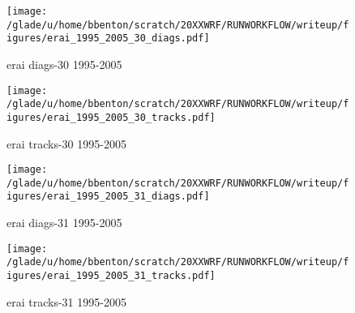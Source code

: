 \begin{figure}[!tbp]
\centering
\begin{minipage}[b]{0.45\textwidth}
\texttt{[image: /glade/u/home/bbenton/scratch/20XXWRF/RUNWORKFLOW/writeup/figures/erai\_1995\_2005\_30\_diags.pdf]}
\caption{erai diags-30 1995-2005}
\end{minipage}
\hfill
\begin{minipage}[b]{0.45\textwidth}
\texttt{[image: /glade/u/home/bbenton/scratch/20XXWRF/RUNWORKFLOW/writeup/figures/erai\_1995\_2005\_30\_tracks.pdf]}
\caption{erai tracks-30 1995-2005}
\end{minipage}
\end{figure}

\begin{figure}[!tbp]
\centering
\begin{minipage}[b]{0.45\textwidth}
\texttt{[image: /glade/u/home/bbenton/scratch/20XXWRF/RUNWORKFLOW/writeup/figures/erai\_1995\_2005\_31\_diags.pdf]}
\caption{erai diags-31 1995-2005}
\end{minipage}
\hfill
\begin{minipage}[b]{0.45\textwidth}
\texttt{[image: /glade/u/home/bbenton/scratch/20XXWRF/RUNWORKFLOW/writeup/figures/erai\_1995\_2005\_31\_tracks.pdf]}
\caption{erai tracks-31 1995-2005}
\end{minipage}
\end{figure}


